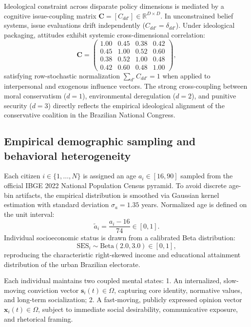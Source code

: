 \documentclass[11pt,a4paper]{article}
\begin{document}
Ideological constraint across disparate policy dimensions is mediated by a cognitive issue-coupling matrix $\mathbf{C} = [C_{dd'}] \in \mathbb{R}^{D \times D}$. In unconstrained belief systems, issue evaluations drift independently ($C_{dd'} = \delta_{dd'}$). Under ideological packaging, attitudes exhibit systemic cross-dimensional correlation:
\begin{equation}
    \mathbf{C} = \begin{pmatrix}
        1.00 & 0.45 & 0.38 & 0.42 \\
        0.45 & 1.00 & 0.52 & 0.60 \\
        0.38 & 0.52 & 1.00 & 0.48 \\
        0.42 & 0.60 & 0.48 & 1.00
    \end{pmatrix},
    \label{eq:coupling_matrix}
\end{equation}
satisfying row-stochastic normalization $\sum_{d'} C_{dd'} = 1$ when applied to interpersonal and exogenous influence vectors. The strong cross-coupling between moral conservatism ($d=1$), environmental deregulation ($d=2$), and punitive security ($d=3$) directly reflects the empirical ideological alignment of the conservative coalition in the Brazilian National Congress.

\subsection{Empirical demographic sampling and behavioral heterogeneity}
\label{sssec:demographics_sampling}
Each citizen $i \in \{1, \dots, N\}$ is assigned an age $a_i \in [16, 90]$ sampled from the official IBGE 2022 National Population Census pyramid. To avoid discrete age-bin artifacts, the empirical distribution is smoothed via Gaussian kernel estimation with standard deviation $\sigma_a = 1.35$ years. Normalized age is defined on the unit interval:
\begin{equation}
    \tilde{a}_i = \frac{a_i - 16}{74} \in [0, 1].
    \label{eq:normalized_age}
\end{equation}
Individual socioeconomic status is drawn from a calibrated Beta distribution:
\begin{equation}
    \mathrm{SES}_i \sim \mathrm{Beta}(2.0, 3.0) \in [0, 1],
    \label{eq:ses_distribution}
\end{equation}
reproducing the characteristic right-skewed income and educational attainment distribution of the urban Brazilian electorate.

Each individual maintains two coupled mental states:
1. An internalized, slow-moving conviction vector $\mathbf{s}_i(t) \in \Omega$, capturing core identity, normative values, and long-term socialization;
2. A fast-moving, publicly expressed opinion vector $\mathbf{x}_i(t) \in \Omega$, subject to immediate social desirability, communicative exposure, and rhetorical framing.
\end{document}
